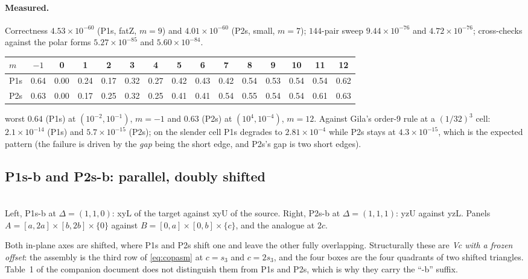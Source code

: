 \documentclass[11pt]{article}
\theoremstyle{remark}
\newcommand{\geofig}[2]{\begin{center}#1\\[2pt]{\footnotesize #2}\end{center}}
\begin{document}
\paragraph{Measured.} Correctness $4.53\times10^{-60}$ (P1s, fatZ, $m=9$) and
$4.01\times10^{-60}$ (P2s, small, $m=7$); $144$-pair sweep $9.44\times10^{-76}$ and
$4.72\times10^{-76}$; cross-checks against the polar forms $5.27\times10^{-85}$ and
$5.60\times10^{-84}$.

\begin{center}\small
\begin{tabular}{@{}lcccccccccccccc@{}}
\toprule
$m$ & $-1$ & 0 & 1 & 2 & 3 & 4 & 5 & 6 & 7 & 8 & 9 & 10 & 11 & 12\\
\midrule
P1s & 0.64 & 0.00 & 0.24 & 0.17 & 0.32 & 0.27 & 0.42 & 0.43 & 0.42 & 0.54 & 0.53 & 0.54 & 0.54 & 0.62\\
P2s & 0.63 & 0.00 & 0.17 & 0.25 & 0.32 & 0.25 & 0.41 & 0.41 & 0.54 & 0.55 & 0.54 & 0.54 & 0.61 & 0.63\\
\bottomrule
\end{tabular}
\end{center}
\noindent
worst $0.64$ (P1s) at $(10^{-2}, 10^{-1})$, $m = -1$ and $0.63$ (P2s) at
$(10^{4}, 10^{-4})$, $m = 12$. Against Gila's order-9 rule at a $(1/32)^3$ cell:
$2.1\times10^{-14}$ (P1s) and $5.7\times10^{-15}$ (P2s); on the slender cell P1s degrades
to $2.81\times10^{-4}$ while P2s stays at $4.3\times10^{-15}$, which is the expected
pattern (the failure is driven by the \emph{gap} being the short edge, and P2s's gap is
two short edges).

\subsection{P1s-b and P2s-b: parallel, doubly shifted}
\label{sec:P12sb}

\geofig{\figPasb\qquad\figPbsb}{Left, P1s-b at $\Delta = (1,1,0)$: xyL of the target
against xyU of the source. Right, P2s-b at $\Delta = (1,1,1)$: yzU against yzL. Panels
$A = [a,2a]\times[b,2b]\times\{0\}$ against $B = [0,a]\times[0,b]\times\{c\}$, and the
analogue at $2c$.}

Both in-plane axes are shifted, where P1s and P2s shift one and leave the other fully
overlapping. Structurally these are \emph{Vc with a frozen offset}: the assembly is the
third row of \eqref{eq:copasm} at $c = s_3$ and $c = 2s_3$, and the four boxes are the four
quadrants of two shifted triangles. Table~1 of the companion document does not distinguish
them from P1s and P2s, which is why they carry the ``-b'' suffix.
\end{document}

